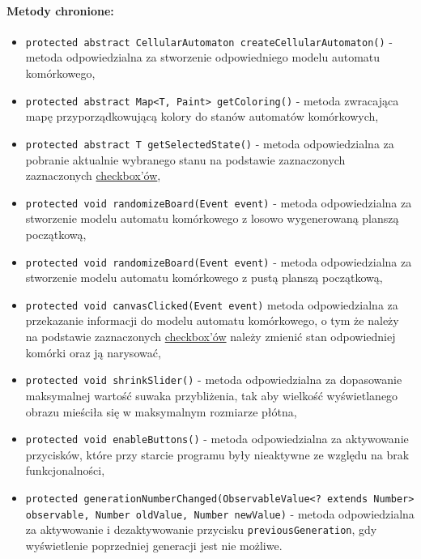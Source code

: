 \documentclass{report}
\begin{document}
\paragraph{Metody chronione:}
\begin{itemize}
	\item \texttt{protected abstract CellularAutomaton createCellularAutomaton()} - metoda odpowiedzialna za stworzenie odpowiedniego modelu automatu komórkowego,
	\item \texttt{protected abstract Map<T, Paint> getColoring()} - metoda zwracająca mapę przyporządkowującą kolory do stanów automatów komórkowych,
	\item \texttt{protected abstract T getSelectedState()} - metoda odpowiedzialna za pobranie aktualnie wybranego stanu na podstawie zaznaczonych  zaznaczonych \hyperref[sec:checkbox]{checkbox'ów}, 
	\item \texttt{protected void randomizeBoard(Event event)} - metoda odpowiedzialna za stworzenie modelu automatu komórkowego z losowo wygenerowaną planszą początkową,
	\item \texttt{protected void randomizeBoard(Event event)} - metoda odpowiedzialna za stworzenie modelu automatu komórkowego z pustą planszą początkową,
	\item \texttt{protected void canvasClicked(Event event)} metoda odpowiedzialna za przekazanie informacji do modelu automatu komórkowego, o tym że należy na podstawie zaznaczonych \hyperref[sec:checkbox]{checkbox'ów} należy zmienić stan odpowiedniej komórki oraz ją narysować,
 	\item \texttt{protected void shrinkSlider()} - metoda odpowiedzialna za dopasowanie maksymalnej wartość suwaka przybliżenia, tak aby 		wielkość wyświetlanego obrazu mieściła się w maksymalnym rozmiarze płótna,
 	\item \texttt{protected void enableButtons()} - metoda odpowiedzialna za aktywowanie przycisków, które przy starcie programu były 			nieaktywne ze względu na brak funkcjonalności,
 	\item \texttt{protected generationNumberChanged(ObservableValue<? extends Number> observable, Number oldValue, Number newValue)} - metoda odpowiedzialna za aktywowanie i dezaktywowanie przycisku 							\texttt{previousGeneration}, gdy wyświetlenie poprzedniej generacji jest nie możliwe.
\end{itemize}
\end{document}
